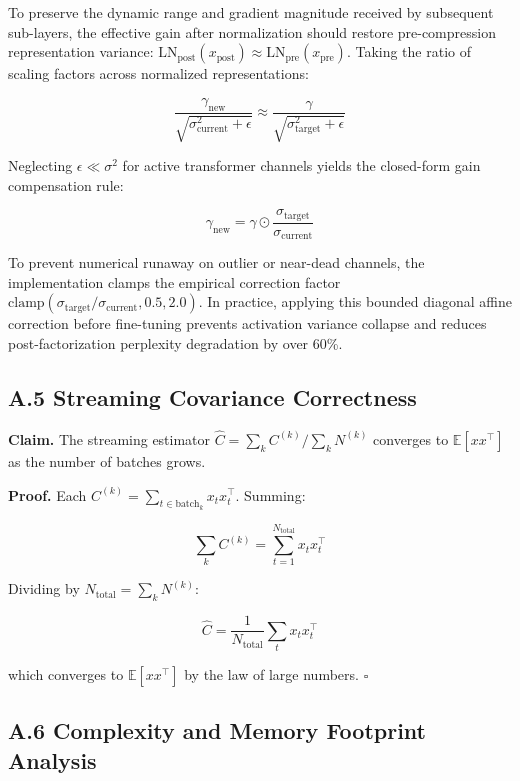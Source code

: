 To preserve the dynamic range and gradient magnitude received by subsequent sub-layers, the effective gain after normalization should restore pre-compression representation variance: $\mathrm{LN}_{\mathrm{post}}(x_{\mathrm{post}}) \approx \mathrm{LN}_{\mathrm{pre}}(x_{\mathrm{pre}})$. Taking the ratio of scaling factors across normalized representations:

\[
\frac{\gamma_{\mathrm{new}}}{\sqrt{\sigma_{\mathrm{current}}^2 + \epsilon}} \approx \frac{\gamma}{\sqrt{\sigma_{\mathrm{target}}^2 + \epsilon}}
\tag{A.10}
\]

Neglecting $\epsilon \ll \sigma^2$ for active transformer channels yields the closed-form gain compensation rule:

\[
\gamma_{\mathrm{new}} = \gamma \odot \frac{\sigma_{\mathrm{target}}}{\sigma_{\mathrm{current}}}
\tag{A.11}
\]

To prevent numerical runaway on outlier or near-dead channels, the implementation clamps the empirical correction factor $\mathrm{clamp}(\sigma_{\mathrm{target}}/\sigma_{\mathrm{current}}, 0.5, 2.0)$. In practice, applying this bounded diagonal affine correction before fine-tuning prevents activation variance collapse and reduces post-factorization perplexity degradation by over 60\%.

\subsection{A.5 Streaming Covariance Correctness}

\textbf{Claim.} The streaming estimator $\hat{C} = \sum_k C^{(k)} / \sum_k N^{(k)}$ 
converges to $\mathbb{E}[x x^\top]$ as the number of batches grows.

\textbf{Proof.} Each $C^{(k)} = \sum_{t \in \text{batch}_k} x_t x_t^\top$. Summing:

\[
\sum_k C^{(k)} = \sum_{t = 1}^{N_\text{total}} x_t x_t^\top
\tag{A.14}
\]

Dividing by $N_\text{total} = \sum_k N^{(k)}$:

\[
\hat{C} = \frac{1}{N_\text{total}} \sum_t x_t x_t^\top
\tag{A.15}
\]

which converges to $\mathbb{E}[x x^\top]$ by the law of large numbers. $\square$

\subsection{A.6 Complexity and Memory Footprint Analysis}
\label{sec:app_complexity}

